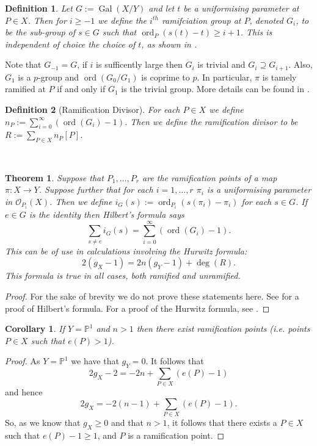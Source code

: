 \documentclass[11pt]{article} %
\newtheorem{defn}{Definition}
\newtheorem{thm}{Theorem}
\newtheorem{cor}{Corollary}
\DeclareMathOperator{\ord}{ord}
\DeclareMathOperator{\gal}{Gal}
\begin{document}
\begin{defn}
	Let $G:=\gal(X/Y)$ and let $t$ be a uniformising parameter at $P\in X$. Then for $i\geq -1$ we define the 
	$i^{th}$ ramifciation group at $P$, denoted $G_i$, to be the sub-group of $s\in G$ such that $\ord_P(s(t)-t)\geq i+1$. This is
	independent of choice the choice of $t$, as shown in \citep[$\S$1, Ch. IV]{localfields}.
\end{defn}

Note that $G_{-1}=G$, if $i$ is sufficently large then $G_i$ is trivial and $G_i\supseteq G_{i+1}$. Also, $G_1$ is a $p$-group and 
$\ord(G_0/G_1)$ is coprime to $p$. In particular, $\pi$ is tamely ramified at $P$ if and only if $G_1$ is the trivial group. More details
can be found in \citep[Ch. IV]{localfields}.\\

\begin{defn}[Ramification Divisor]
	For each $P\in X$ we define $n_P:=\sum_{i=0}^{\infty}(\ord(G_i)-1)$. Then we define the ramification divisor to be $R:=\sum_{P\in X}n_P[P]$.
\end{defn}
~
\begin{thm}
	Suppose that $P_1,\ldots ,P_r$ are the ramification points of a map $\pi:X\rightarrow Y$. Suppose further that for each 
	$i=1,\ldots ,r$ $\pi_i$ is a uniformising parameter in $\mathscr{O}_{P_i}(X)$. Then we define 
	$i_G(s):=\ord_{P_i}(s(\pi_i)-\pi_i)$ for each $s\in G$. If $e\in G$ is the identity then Hilbert's formula says
	\[
	    \sum_{s\neq e}i_G(s)=\sum_{i=0}^{\infty}\left(\ord(G_i)-1\right).
	\]
	This can be of use in calculations involving the Hurwitz formula:
	\[
	    2(g_X-1)=2n(g_Y-1)+\deg(R).
	\]
	This formula is true in all cases, both ramified and unramified.
\end{thm}
\begin{proof}
	For the sake of brevity we do not prove these statements here. See \citep[Prop. 4, $\S$1, Ch. IV]{localfields} for a proof of 
	Hilbert's formula. For a proof of the Hurwitz formula, see \citep[Cor. 2.4, Ch. IV]{hart}.
\end{proof}

\begin{cor}
	If $Y=\mathbb{P}^{1}$ and $n>1$ then there exist ramification points (i.e. points  $P\in X$ such that $e(P)>1$).
\end{cor}
\begin{proof}
	As $Y=\mathbb{P}^{1}$ we have that $g_{Y}=0$. It follows that 
		\begin{equation*}
			2g_{X}-2=-2n+\sum_{P\in X}(e(P)-1)
		\end{equation*}
	 and hence
		\begin{equation*}
			2g_{X}=-2(n-1)+\sum_{P\in X} (e(P)-1).
		\end{equation*}
	So, as we know that $g_{X}\geq 0$ and that $n>1$, it follows that there exists a $P\in X$ such that $e(P)-1\geq 1$,
	and $P$ is a ramification point.
\end{proof}
\end{document}
